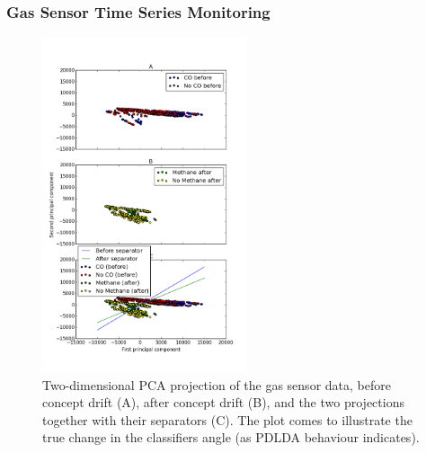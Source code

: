 \documentclass{sig-alternate-05-2015}
\begin{document}


\subsubsection{Gas Sensor Time Series Monitoring} 

\begin{figure}[h!]
\centering
\includegraphics[width=60mm]{BigGas/showData.png}
\caption{Two-dimensional PCA projection of the gas sensor data, 
before concept drift (A), after concept drift (B), 
and the two projections together with their separators (C). 
The plot comes to illustrate the true change in the classifiers angle (as PDLDA
behaviour indicates).}
\label{BigGasShowData}
\end{figure}
\end{document}

